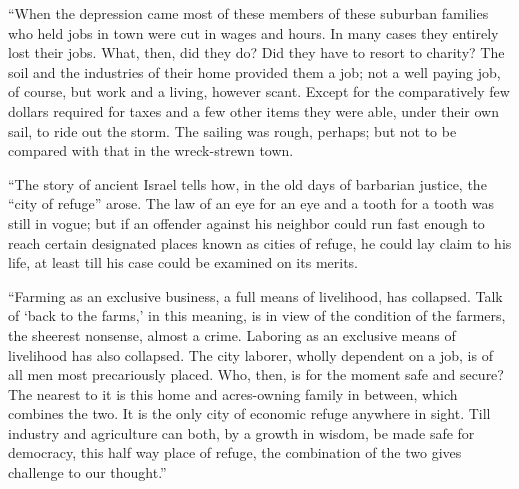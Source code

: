 \documentclass{book}
\begin{document}
“When the depression came most of these members of these suburban families who held jobs in town were cut in wages and hours. In many cases they entirely lost their jobs. What, then, did they do? Did they have to resort to charity? The soil and the industries of their home provided them a job; not a well paying job, of course, but work and a living, however scant. Except for the comparatively few dollars required for taxes and a few other items they were able, under their own sail, to ride out the storm. The sailing was rough, perhaps; but not to be compared with that in the wreck-strewn town.

“The story of ancient Israel tells how, in the old days of barbarian justice, the “city of refuge” arose. The law of an eye for an eye and a tooth for a tooth was still in vogue; but if an offender against his neighbor could run fast enough to reach certain designated places known as cities of refuge, he could lay claim to his life, at least till his case could be examined on its merits.

“Farming as an exclusive business, a full means of livelihood, has collapsed. Talk of ‘back to the farms,’ in this meaning, is in view of the condition of the farmers, the sheerest nonsense, almost a crime. Laboring as an exclusive means of livelihood has also collapsed. The city laborer, wholly dependent on a job, is of all men most precariously placed. Who, then, is for the moment safe and secure? The nearest to it is this home and acres-owning family in between, which combines the two. It is the only city of economic refuge anywhere in sight. Till industry and agriculture can both, by a growth in wisdom, be made safe for democracy, this half way place of refuge, the combination of the two gives challenge to our thought.”
\end{document}
